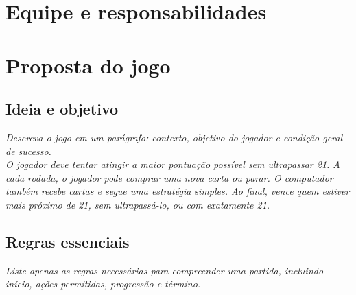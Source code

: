 \documentclass[11pt]{article}
\begin{document}


\vspace{1cm}


\vspace{1cm}
\section{Equipe e responsabilidades}
\TabelaEquipeCompleta

\section{Proposta do jogo}
\subsection{Ideia e objetivo}
\textit{Descreva o jogo em um parágrafo: contexto, objetivo do jogador e condição geral de sucesso.}\\

 \textit{O jogador deve tentar atingir a maior pontuação possível sem ultrapassar 21. A cada rodada, o jogador pode comprar uma nova carta ou parar. O computador também recebe cartas e segue uma estratégia simples. Ao final, vence quem estiver mais próximo de 21, sem ultrapassá-lo, ou com exatamente 21.}
\AnswerSpace{5mm}

\subsection{Regras essenciais}
\textit{Liste apenas as regras necessárias para compreender uma partida, incluindo início, ações permitidas, progressão e término.} \\
\end{document}
